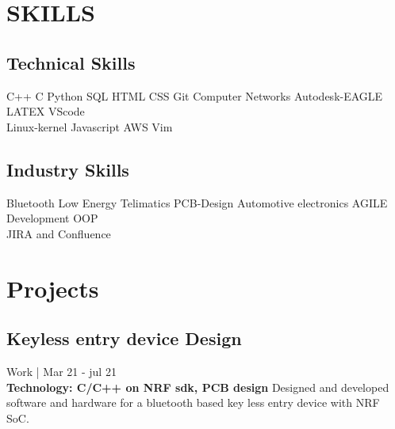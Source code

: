 \documentclass[]{Abhijoshi}
\begin{document}
\hfill
\begin{minipage}[t]{0.49\textwidth} 
\hspace{4mm}



\section{SKILLS}
\subsection{Technical Skills}
\vspace{0.5mm}
C++ \textbullet{}  C \textbullet{} Python \textbullet{} SQL \textbullet{} HTML \textbullet{} CSS \textbullet{} Git \textbullet{} Computer Networks \textbullet{} Autodesk-EAGLE\textbullet{} LATEX \textbullet{}VScode \\
\vspace{0.5mm}
\textbullet{}Linux-kernel \textbullet{} Javascript \textbullet{} AWS
\textbullet{}Vim
\sectionsep

\subsection{Industry Skills}
\vspace{0.5mm}
\textbullet{} Bluetooth Low Energy \textbullet{} Telimatics \textbullet{} PCB-Design \textbullet{} Automotive electronics\textbullet{} AGILE Development \textbullet{} OOP\\ \textbullet{} JIRA and Confluence 
\vspace{2mm}

\section{Projects}
\vspace{0.5mm}

\subsection{K\MakeLowercase{eyless Entry device} D\MakeLowercase{esign}}
Work | Mar 21 - jul 21 \\
\vspace{0.5mm}
\textbf{Technology: C/C++ on NRF sdk, PCB design}
\vspace{0.5mm}
Designed and developed software and hardware for a bluetooth based key less entry device with NRF SoC.


\end{minipage}
\end{document}
